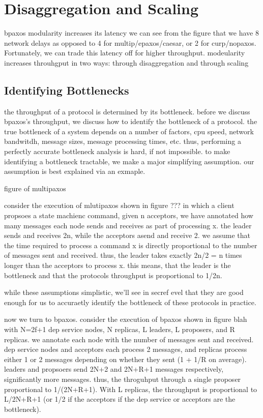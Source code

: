 \section{Disaggregation and Scaling}

bpaxos modularity increases its latency
we can see from the figure that we have 8 network delays as opposed to 4 for multip/epaxos/caesar, or 2 for curp/nopaxos. Fortunately, we can trade this latency off for higher throughput. modeularity increases throuhgput in two ways: through disaggregation and through scaling

\subsection{Identifying Bottlenecks}
the throughput of a protocol is determined by its bottleneck. before we discuss bpaxos's throughput, we discuss how to identify the bottleneck of a protocol. the true bottleneck of a system depends on a number of factors, cpu speed, network bandwitdh, message sizes, message processing times, etc. thus, performing a perfectly accurate bottleneck analysis is hard, if not impossible. to make identifying a bottleneck tractable, we make a major simplifying assumption. our assumption is best explained via an exmaple.

figure of multipaxos

consider the execution of mlutipaxos shown in figure ??? in which a client propsoes a state machienc command, given n acceptors, we have annotated how many messages each node sends and receives as part of processing x. the leader sends and receives 2n, while the acceptors asend and receive 2. we assume that the time required to process a command x is directly proportional to the number of messages sent and received. thus, the leader takes exactly 2n/2 = n times longer than the acceptors to process x. this means, that the leader is the bottleneck and that the protocols throughput is proportional to 1/2n.

while these assumptions simplistic, we'll see in secref evel that they are good enough for us to accuraetly identify the bottleneck of these protocols in practice.

now we turn to bpaxos. consider the execution of bpaxos shown in figure blah with N=2f+1 dep service nodes, N replicas, L leaders, L proposers, and R replicas. we annotate each node with the number of messages sent and received. dep service nodes and acceptors each process 2 messages, and replicas process either 1 or 2 messages depending on whether they sent (1 + 1/R on average). leaders and propsoers send 2N+2 and 2N+R+1 messages respectively, significantly more messages. thus, the throguhput through a single proposer proportional to 1/(2N+R+1). With L replicas, the throughput is proportional to L/2N+R+1 (or 1/2 if the acceptors if the dep service or acceptors are the bottleneck).

